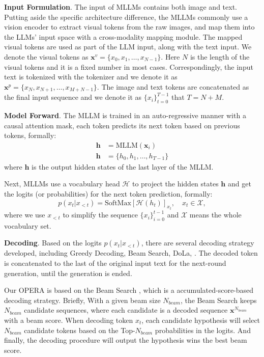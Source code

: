 \documentclass[10pt,twocolumn,letterpaper]{article}
\begin{document}
\noindent\textbf{Input Formulation}.  
The input of MLLMs contains both image and text. Putting aside the specific architecture difference, the MLLMs commonly use a vision encoder to extract visual tokens from the raw images, and map them into the LLMs' input space with a cross-modality mapping module. The mapped visual tokens are used as part of the LLM input, along with the text input. We denote the visual tokens as $\mathbf{x}^v = \{x_0,x_1,\ldots,x_{N-1}\}$. Here $N$ is the length of the visual tokens and it is a fixed number in most cases.  
Correspondingly, the input text is tokenized with the tokenizer and we denote it as $\mathbf{x}^p = \{x_N,x_{N+1},\ldots,x_{M+N-1}\}$.
The image and text tokens are concatenated as the final input sequence and we denote it as  $\{x_i\}_{t=0}^{T-1}$ that $T=N+M$.

\noindent\textbf{Model Forward}.  
The MLLM is trained in an auto-regressive manner with a causal attention mask, each token predicts its next token based on previous tokens, formally:
\begin{equation}
\begin{aligned}
    \mathbf{h} &= \mathrm{MLLM}(\mathbf{x}_i) \\ 
    \mathbf{h} &= \{h_0,h_1,\ldots,h_{T-1}\}
\end{aligned}
\end{equation}
where $\mathbf{h}$ is the output hidden states of the last layer of the MLLM.

Next, MLLMs use a vocabulary head $\mathcal{H}$ to project the hidden states $\mathbf{h}$ and get the logits (or probabilities) for the next token prediction, formally:
\begin{equation}
    p(x_t|x_{<t}) = \text{SoftMax}[\mathcal{H}(h_t)]_{x_t}, \quad x_t\in \mathcal{X},
\end{equation}
where we use $x_{<t}$ to simplify the sequence $\{x_i\}_{i=0}^{t-1}$ and $\mathcal{X}$ means the whole vocabulary set. 

\noindent\textbf{Decoding}.  
Based on the logits $p(x_t|x_{<t})$, there are several decoding strategy developed, including Greedy Decoding, Beam Search, DoLa, \etc. The decoded token is concatenated to the last of the original input text for the next-round generation, until the generation is ended. 

Our OPERA is based on the Beam Search \cite{graves2012sequence,sutskever2014sequence,boulanger2013audio}, which is a accumulated-score-based decoding strategy. Briefly, With a given beam size $N_{beam}$, the Beam Search keeps $N_{beam}$ candidate sequences, where each candidate is a decoded sequence $\mathbf{x}^{N_{beam}}$ with a beam score. When decoding token $x_t$, each candidate hypothesis will select $N_{beam}$ candidate tokens based on the Top-$N_{beam}$ probabilities in the logits. And finally, the decoding procedure will output the hypothesis wins the best beam score.
\end{document}
